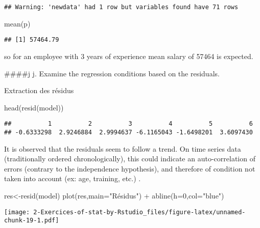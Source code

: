 \documentclass[
]{article}
\newenvironment{Shaded}{\begin{snugshade}}{\end{snugshade}}
\newcommand{\AttributeTok}[1]{\textcolor[rgb]{0.77,0.63,0.00}{#1}}
\newcommand{\DecValTok}[1]{\textcolor[rgb]{0.00,0.00,0.81}{#1}}
\newcommand{\FunctionTok}[1]{\textcolor[rgb]{0.00,0.00,0.00}{#1}}
\newcommand{\NormalTok}[1]{#1}
\newcommand{\OtherTok}[1]{\textcolor[rgb]{0.56,0.35,0.01}{#1}}
\newcommand{\SpecialCharTok}[1]{\textcolor[rgb]{0.00,0.00,0.00}{#1}}
\newcommand{\StringTok}[1]{\textcolor[rgb]{0.31,0.60,0.02}{#1}}
\begin{document}
\begin{verbatim}
## Warning: 'newdata' had 1 row but variables found have 71 rows
\end{verbatim}

\begin{Shaded}
\begin{Highlighting}[]
\FunctionTok{mean}\NormalTok{(p)}
\end{Highlighting}
\end{Shaded}

\begin{verbatim}
## [1] 57464.79
\end{verbatim}

so for an employee with 3 years of experience mean salary of 57464 is
expected.

\#\#\#\#j j. Examine the regression conditions based on the residuals.

Extraction des résidus

\begin{Shaded}
\begin{Highlighting}[]
\FunctionTok{head}\NormalTok{(}\FunctionTok{resid}\NormalTok{(model))}
\end{Highlighting}
\end{Shaded}

\begin{verbatim}
##          1          2          3          4          5          6 
## -0.6333298  2.9246884  2.9994637 -6.1165043 -1.6498201  3.6097430
\end{verbatim}

It is observed that the residuals seem to follow a trend. On time series
data (traditionally ordered chronologically), this could indicate an
auto-correlation of errors (contrary to the independence hypothesis),
and therefore of condition not taken into account (ex: age, training,
etc.) .

\begin{Shaded}
\begin{Highlighting}[]
\NormalTok{res}\OtherTok{\textless{}{-}}\FunctionTok{resid}\NormalTok{(model)}
\FunctionTok{plot}\NormalTok{(res,}\AttributeTok{main=}\StringTok{"Résidus"}\NormalTok{) }\SpecialCharTok{+} \FunctionTok{abline}\NormalTok{(}\AttributeTok{h=}\DecValTok{0}\NormalTok{,}\AttributeTok{col=}\StringTok{"blue"}\NormalTok{)}
\end{Highlighting}
\end{Shaded}

\texttt{[image: 2-Exercices-of-stat-by-Rstudio\_files/figure-latex/unnamed-chunk-19-1.pdf]}
\end{document}
